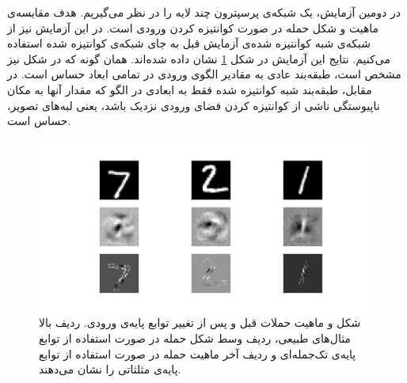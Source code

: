 \documentclass[12pt,onecolumn,a4paper]{article}
\begin{document}
\begin{table}[]
    \begin{latin}
    \end{latin}
    \caption{مدل‌های استفاده شده در آزمایش، ابعاد آنها و دقت آنها قبل و پس از حمله‌ی . همان طور که مشاهده می‌شود، کوانتیزه کردن ورودی تاثیر بسیار قابل توجهی بر روی شانس موفقیت حمله دارد.}
    \label{tbl:sizes}
\end{table}

در دومین آزمایش، یک شبکه‌ی پرسپترون چند لایه را در نظر می‌گیریم. هدف مقایسه‌ی ماهیت و شکل حمله در صورت کوانتیزه کردن ورودی است. در این آزمایش نیز از شبکه‌ی شبه کوانتیزه شده‌ی آزمایش قبل به جای شبکه‌ی کوانتیزه شده استفاده می‌کنیم. نتایج این آزمایش در شکل \ref{fig:shape} نشان داده شده‌اند. همان گونه که در شکل نیز مشخص است، طبقه‌بند عادی به مقادیر الگوی ورودی در تمامی ابعاد حساس است. در مقابل، طبقه‌بند شبه کوانتیزه شده فقط به ابعادی در الگو که مقدار آنها به مکان ناپیوستگی ناشی از کوانتیزه کردن فضای ورودی نزدیک باشد، یعنی لبه‌های تصویر، حساس است.

\begin{figure}[t]
	\centering
	\includegraphics[width=\linewidth]{shapeshift.png}
	\caption{شکل و ماهیت حملات قبل و پس از تغییر توابع پایه‌ی ورودی. ردیف بالا مثال‌های طبیعی، ردیف وسط شکل حمله در صورت استفاده از توابع پایه‌ی تک‌جمله‌ای و ردیف آخر ماهیت حمله در صورت استفاده از توابع پایه‌ی مثلثاتی را نشان می‌دهند.}
	\label{fig:shape}
\end{figure}
\end{document}
